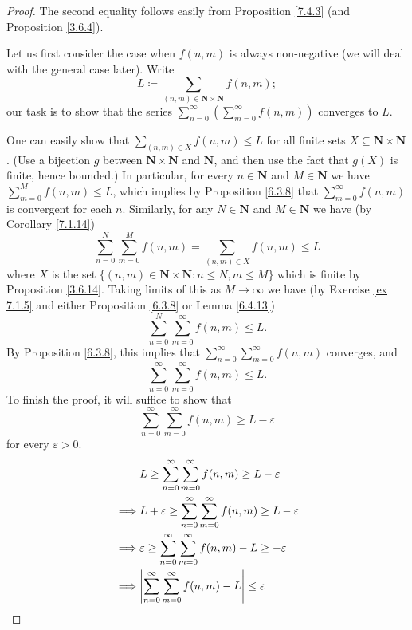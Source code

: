 \begin{proof}
    The second equality follows easily from Proposition \ref{7.4.3} (and Proposition \ref{3.6.4}).

    Let us first consider the case when \(f(n, m)\) is always non-negative (we will deal with the general case later).
    Write
    \[
        L \coloneqq \sum_{(n, m) \in \mathbf{N} \times \mathbf{N}} f(n, m);
    \]
    our task is to show that the series \(\sum_{n = 0}^\infty (\sum_{m = 0}^\infty f(n, m))\) converges to \(L\).

    One can easily show that \(\sum_{(n, m) \in X} f(n, m) \leq L\) for all finite sets \(X \subseteq \mathbf{N} \times \mathbf{N}\).
    (Use a bijection \(g\) between \(\mathbf{N} \times \mathbf{N}\) and \(\mathbf{N}\), and then use the fact that \(g(X)\) is finite, hence bounded.)
    In particular, for every \(n \in \mathbf{N}\) and \(M \in \mathbf{N}\) we have \(\sum_{m = 0}^M f(n, m) \leq L\), which implies by Proposition \ref{6.3.8} that \(\sum_{m = 0}^\infty f(n, m)\) is convergent for each \(n\).
    Similarly, for any \(N \in \mathbf{N}\) and \(M \in \mathbf{N}\) we have (by Corollary \ref{7.1.14})
    \[
        \sum_{n = 0}^N \sum_{m = 0}^M f(n, m) = \sum_{(n, m) \in X} f(n, m) \leq L
    \]
    where \(X\) is the set \(\{(n,m) \in \mathbf{N} \times \mathbf{N} : n \leq N, m \leq M\}\) which is finite by Proposition \ref{3.6.14}.
    Taking limits of this as \(M \to \infty\) we have (by Exercise \ref{ex 7.1.5} and either Proposition \ref{6.3.8} or Lemma \ref{6.4.13})
    \[
        \sum_{n = 0}^N \sum_{m = 0}^\infty f(n, m) \leq L.
    \]
    By Proposition \ref{6.3.8}, this implies that \(\sum_{n = 0}^\infty \sum_{m = 0}^\infty f(n, m)\) converges, and
    \[
        \sum_{n = 0}^\infty \sum_{m = 0}^\infty f(n, m) \leq L.
    \]
    To finish the proof, it will suffice to show that
    \[
        \sum_{n = 0}^\infty \sum_{m = 0}^\infty f(n, m) \geq L - \varepsilon
    \]
    for every \(\varepsilon > 0\).
    \begin{align*}
                 & L \geq \sum_{n = 0}^\infty \sum_{m = 0}^\infty f(n, m) \geq L - \varepsilon               \\
        \implies & L + \varepsilon \geq \sum_{n = 0}^\infty \sum_{m = 0}^\infty f(n, m) \geq L - \varepsilon \\
        \implies & \varepsilon \geq \sum_{n = 0}^\infty \sum_{m = 0}^\infty f(n, m) - L \geq -\varepsilon    \\
        \implies & \abs*{\sum_{n = 0}^\infty \sum_{m = 0}^\infty f(n, m) - L} \leq \varepsilon               \\

\end{align*}
\end{proof}
